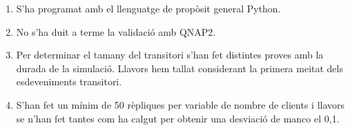 \begin{enumerate}

  \item S'ha programat amb el llenguatge de propòsit general Python.

  \item No s'ha duit a terme la validació amb QNAP2.

  \item Per determinar el tamany del transitori s'han fet distintes proves amb
    la durada de la simulació. Llavors hem tallat considerant la primera meitat
    dels esdeveniments transitori.

  \item S'han fet un mínim de 50 rèpliques per variable de nombre de clients i
    llavors se n'han fet tantes com ha calgut per obtenir una desviació de
    manco el 0,1.

\end{enumerate}
